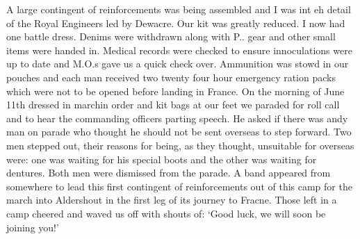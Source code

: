 A large contingent of reinforcements was being assembled and I was int
eh detail of the Royal Engineers led by \lieutenant Dewacre. Our kit was
greatly reduced. I now had one battle dress. Denims were withdrawn
along with P.. gear and other small items were handed in. Medical
records were checked to ensure innoculations were up to date and M.O.s
gave us a quick check over. Ammunition was stowd in our pouches and
each man received two twenty four hour emergency ration packs which
were not to be opened before landing in France. On the morning of June
11th dressed in marchin order and kit bags at our feet we paraded for
roll call and to hear the commanding officers parting speech. He asked
if there was andy man on parade who thought he should not be sent
overseas to step forward. Two men stepped out, their reasons for
being, as they thought, unsuitable for overseas were: one was waiting
for his special boots and the other was waiting for dentures. Both men
were dismissed from the parade. A band appeared from somewhere to lead
this first contingent of reinforcements out of this camp for the march
into Aldershout in the first leg of its journey to Fracne. Those left
in a camp cheered and waved us off with shouts of: `Good luck, we will
soon be joining you!'


